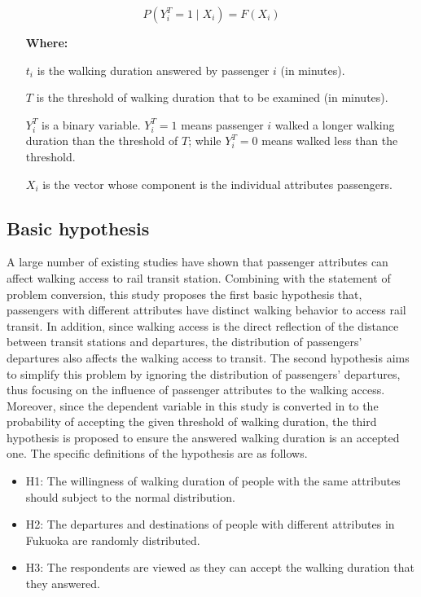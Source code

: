 \begin{equation}
P(Y^T_i=1 \mid X_i)=F(X_i)
\label{eq:chp2:probability}
\end{equation}

%
\begin{enumerate}
	\setlength{\parskip}{0\baselineskip} %
	\normalsize
	\item[\textbf{Where:}]
	\item[$t_i$] is the walking duration answered by passenger $i$ (in minutes).
	\item[$T$] is the threshold of walking duration that to be examined (in minutes).
	\item[$Y^T_i$] is a binary variable. $Y^T_i=1$ means passenger $i$ walked a longer walking duration than the threshold of $T$; while $Y^T_i=0$ means walked less than the threshold.
	\item[$X_i$] is the vector whose component is the individual attributes passengers.
	\setlength{\parskip}{0.7\baselineskip} %
\end{enumerate}


\subsection{Basic hypothesis}
A large number of existing studies have shown that passenger attributes can affect walking access to rail transit station. Combining with the statement of problem conversion, this study proposes the first basic hypothesis that, passengers with different attributes have distinct walking behavior to access rail transit. In addition, since walking access is the direct reflection of the distance between transit stations and departures, the distribution of passengers' departures also affects the walking access to transit. The second hypothesis aims to simplify this problem by ignoring the distribution of passengers' departures, thus focusing on the influence of passenger attributes to the walking access. Moreover, since the dependent variable in this study is converted in to the probability of accepting the given threshold of walking duration, the third hypothesis is proposed to ensure the answered walking duration is an accepted one. The specific definitions of the hypothesis are as follows.

\begin{itemize}
	\setlength{\parskip}{0\baselineskip} %
	\item H1: The willingness of walking duration of people with the same attributes should subject to the normal distribution.
	\item H2: The departures and destinations of people with different attributes in Fukuoka are randomly distributed.
	\item H3: The respondents are viewed as they can accept the walking duration that they answered.
	\setlength{\parskip}{0.7\baselineskip} %
\end{itemize}

